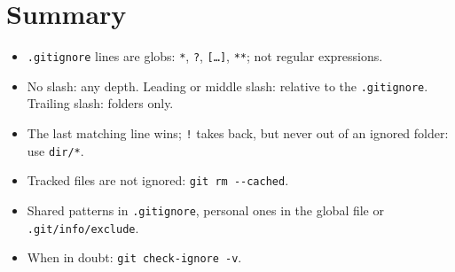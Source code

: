 \documentclass[11pt,a4paper]{article}
\begin{document}
\section{Summary}


\begin{itemize}
  \item \texttt{.gitignore} lines are globs: \texttt{*}, \texttt{?}, \texttt{[\dots]}, \texttt{**}; not regular expressions.
  \item No slash: any depth. Leading or middle slash: relative to the \texttt{.gitignore}. Trailing slash: folders only.
  \item The last matching line wins; \texttt{!} takes back, but never out of an ignored folder: use \texttt{dir/*}.
  \item Tracked files are not ignored: \texttt{git rm -{}-cached}.
  \item Shared patterns in \texttt{.gitignore}, personal ones in the global file or \texttt{.git/info/exclude}.
  \item When in doubt: \texttt{git check-ignore -v}.
\end{itemize}
\end{document}
